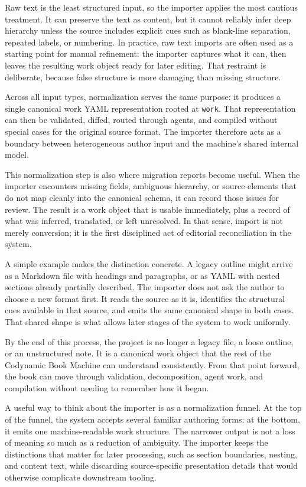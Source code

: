 \documentclass[11pt]{article}
\begin{document}
Raw text is the least structured input, so the importer applies the most cautious treatment. It can preserve the text as content, but it cannot reliably infer deep hierarchy unless the source includes explicit cues such as blank-line separation, repeated labels, or numbering. In practice, raw text imports are often used as a starting point for manual refinement: the importer captures what it can, then leaves the resulting work object ready for later editing. That restraint is deliberate, because false structure is more damaging than missing structure.

Across all input types, normalization serves the same purpose: it produces a single canonical work YAML representation rooted at \texttt{work}. That representation can then be validated, diffed, routed through agents, and compiled without special cases for the original source format. The importer therefore acts as a boundary between heterogeneous author input and the machine's shared internal model.

This normalization step is also where migration reports become useful. When the importer encounters missing fields, ambiguous hierarchy, or source elements that do not map cleanly into the canonical schema, it can record those issues for review. The result is a work object that is usable immediately, plus a record of what was inferred, translated, or left unresolved. In that sense, import is not merely conversion; it is the first disciplined act of editorial reconciliation in the system.

A simple example makes the distinction concrete. A legacy outline might arrive as a Markdown file with headings and paragraphs, or as YAML with nested sections already partially described. The importer does not ask the author to choose a new format first. It reads the source as it is, identifies the structural cues available in that source, and emits the same canonical shape in both cases. That shared shape is what allows later stages of the system to work uniformly.

By the end of this process, the project is no longer a legacy file, a loose outline, or an unstructured note. It is a canonical work object that the rest of the Codynamic Book Machine can understand consistently. From that point forward, the book can move through validation, decomposition, agent work, and compilation without needing to remember how it began.

A useful way to think about the importer is as a normalization funnel. At the top of the funnel, the system accepts several familiar authoring forms; at the bottom, it emits one machine-readable work structure. The narrower output is not a loss of meaning so much as a reduction of ambiguity. The importer keeps the distinctions that matter for later processing, such as section boundaries, nesting, and content text, while discarding source-specific presentation details that would otherwise complicate downstream tooling.
\end{document}
